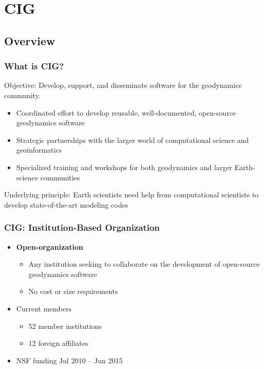 \documentclass{beamer}
\begin{document}
\section{CIG}
\subsection{Overview}

\begin{frame}
  \frametitle{What is CIG?}
 
  \vfill

  Objective: Develop, support, and disseminate software for the
  geodynamics community.

  \vfill

  \begin{itemize}
  \item Coordinated effort to develop reusable, well-documented,
    open-source geodynamics software
  \item Strategic partnerships with the larger world of
    computational science and geoinformatics
  \item Specialized training and workshops for both geodynamics and
    larger Earth-science communities
  \end{itemize}

  \vfill
 
  Underlying principle: Earth scientists need help from computational
  scientists to develop state-of-the-art modeling codes

\end{frame}


\begin{frame}
  \frametitle{CIG: Institution-Based Organization}
 
  \begin{itemize}
  \item {\bf Open-organization}
    \begin{itemize}
    \item Any institution seeking to collaborate on the development of
      open-source geodynamics software
    \item No cost or size requirements
    \end{itemize}
  \item Current members
    \begin{itemize}
    \item 52 member institutions
    \item 12 foreign affiliates
    \end{itemize}
  \item NSF funding Jul 2010 -- Jun 2015
 \end{itemize}
\end{frame}
\end{document}
